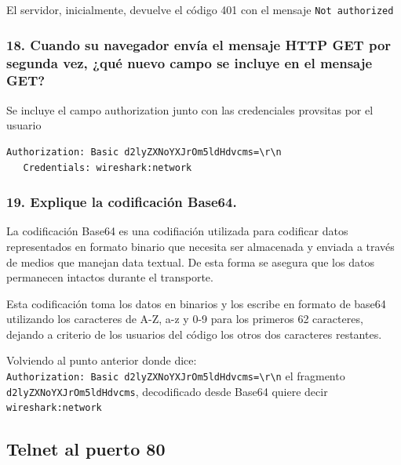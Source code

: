 \documentclass[11pt]{article}
\begin{document}
El servidor, inicialmente, devuelve el código 401 con el mensaje
\texttt{Not\ authorized}

\hypertarget{cuando-su-navegador-envuxeda-el-mensaje-http-get-por-segunda-vez-quuxe9-nuevo-campo-se-incluye-en-el-mensaje-get}{%
\subsubsection{18. Cuando su navegador envía el mensaje HTTP GET por
segunda vez, ¿qué nuevo campo se incluye en el mensaje
GET?}\label{cuando-su-navegador-envuxeda-el-mensaje-http-get-por-segunda-vez-quuxe9-nuevo-campo-se-incluye-en-el-mensaje-get}}

Se incluye el campo authorization junto con las credenciales provsitas
por el usuario

\begin{verbatim}
Authorization: Basic d2lyZXNoYXJrOm5ldHdvcms=\r\n
   Credentials: wireshark:network
\end{verbatim}

\hypertarget{explique-la-codificaciuxf3n-base64.}{%
\subsubsection{19. Explique la codificación
Base64.}\label{explique-la-codificaciuxf3n-base64.}}

La codificación Base64 es una codifiación utilizada para codificar datos
representados en formato binario que necesita ser almacenada y enviada a
través de medios que manejan data textual. De esta forma se asegura que
los datos permanecen intactos durante el transporte.

Esta codificación toma los datos en binarios y los escribe en formato de
base64 utilizando los caracteres de A-Z, a-z y 0-9 para los primeros 62
caracteres, dejando a criterio de los usuarios del código los otros dos
caracteres restantes.

Volviendo al punto anterior donde dice:
\texttt{Authorization:\ Basic\ d2lyZXNoYXJrOm5ldHdvcms=\textbackslash{}r\textbackslash{}n}
el fragmento \texttt{d2lyZXNoYXJrOm5ldHdvcms}, decodificado desde Base64
quiere decir \texttt{wireshark:network}

    \hypertarget{telnet-al-puerto-80}{%
\subsection{Telnet al puerto 80}\label{telnet-al-puerto-80}}
\end{document}
